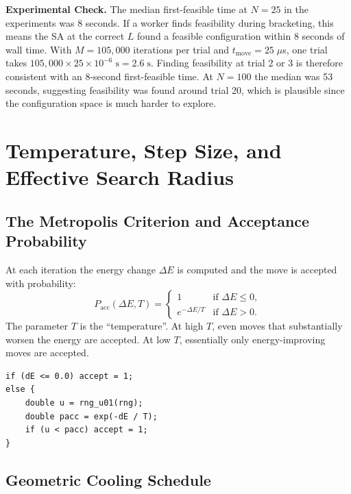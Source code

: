 \documentclass[11pt,oneside]{article}
\newcommand{\expcheck}[1]{\begin{resultbox}\textbf{Experimental Check.} #1\end{resultbox}}
\begin{document}
\expcheck{%
The median first-feasible time at $N=25$ in the experiments was 8
seconds. If a worker finds feasibility during bracketing, this means
the SA at the correct $L$ found a feasible configuration within 8
seconds of wall time. With $M = 105{,}000$ iterations per trial and
$t_{\mathrm{move}} = 25\;\mu$s, one trial takes $105{,}000 \times 25
\times 10^{-6}\;\mathrm{s} = 2.6\;\mathrm{s}$. Finding feasibility
at trial 2 or 3 is therefore consistent with an 8-second first-feasible
time. At $N=100$ the median was 53 seconds, suggesting feasibility was
found around trial 20, which is plausible since the configuration space
is much harder to explore.%
}

\section{Temperature, Step Size, and Effective Search Radius}
\label{sec:temperature}

\subsection{The Metropolis Criterion and Acceptance Probability}

At each iteration the energy change $\Delta E$ is computed and the
move is accepted with probability:
\begin{equation}
  P_{\mathrm{acc}}(\Delta E, T) =
  \begin{cases}
    1 & \text{if } \Delta E \leq 0, \\
    e^{-\Delta E / T} & \text{if } \Delta E > 0.
  \end{cases}
  \label{eq:metro}
\end{equation}
The parameter $T$ is the ``temperature''. At high $T$, even moves that
substantially worsen the energy are accepted. At low $T$, essentially
only energy-improving moves are accepted.

\begin{lstlisting}[style=cstyle,caption={Metropolis step in \texttt{run\_phase()}.}]
if (dE <= 0.0) accept = 1;
else {
    double u = rng_u01(rng);
    double pacc = exp(-dE / T);
    if (u < pacc) accept = 1;
}
\end{lstlisting}

\subsection{Geometric Cooling Schedule}
\end{document}
